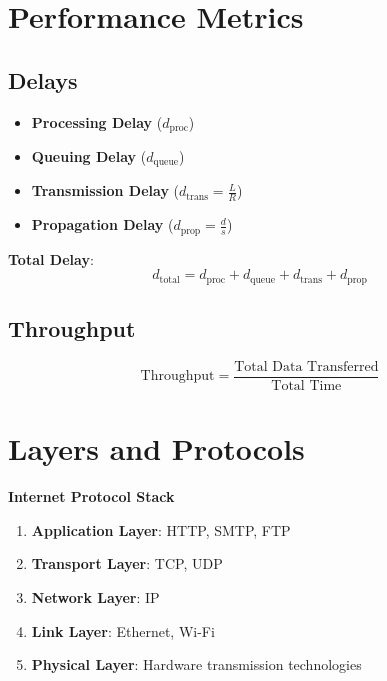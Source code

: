 \documentclass[9pt]{extarticle}
\begin{document}
\begin{multicols*}{3}
{\color{sectioncolor}\section*{\centering Performance Metrics}}
{\color{subsectioncolor}\subsection*{Delays}}
\begin{itemize}
    \item \textbf{Processing Delay} (\( d_{\text{proc}} \))
    \item \textbf{Queuing Delay} (\( d_{\text{queue}} \))
    \item \textbf{Transmission Delay} (\( d_{\text{trans}} = \frac{L}{R} \))
    \item \textbf{Propagation Delay} (\( d_{\text{prop}} = \frac{d}{s} \))
\end{itemize}
\textbf{Total Delay}:
\[
d_{\text{total}} = d_{\text{proc}} + d_{\text{queue}} + d_{\text{trans}} + d_{\text{prop}}
\]

{\color{subsectioncolor}\subsection*{Throughput}}
\[
\text{Throughput} = \frac{\text{Total Data Transferred}}{\text{Total Time}}
\]

{\color{sectioncolor}\section*{\centering Layers and Protocols}}
\textbf{Internet Protocol Stack}
\begin{enumerate}
    \item \textbf{Application Layer}: HTTP, SMTP, FTP
    \item \textbf{Transport Layer}: TCP, UDP
    \item \textbf{Network Layer}: IP
    \item \textbf{Link Layer}: Ethernet, Wi-Fi
    \item \textbf{Physical Layer}: Hardware transmission technologies
\end{enumerate}


\end{multicols*}
\end{document}
